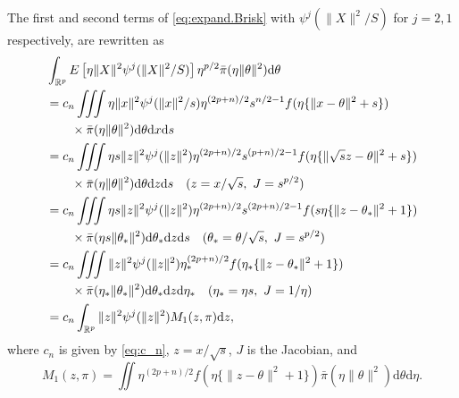 \documentclass[preprint,11pt]{imsart}
\numberwithin{equation}{section}
\theoremstyle{plain}
\theoremstyle{definition}
\theoremstyle{remark}
\newcommand{\rd}{\mathrm{d}}
\begin{document}
The first and second terms of \eqref{eq:expand.Brisk} with $ \psi^j(\|X\|^2/S)$ for $j=2,1$ respectively, are rewritten as
\begin{align}
 & \int_{\mathbb{R}^p} E\left[\eta\|X\|^2\psi^j(\|X\|^2/S)\right]
 \eta^{p/2}\bar{\pi}(\eta\|\theta\|^2) \rd \theta \label{eq:equiv.first.term} \\
 &= c_n \iiint \eta\|x\|^2\psi^j(\|x\|^2/s)
 \eta^{(2p+n)/2}s^{n/2-1}f(\eta\{\|x-\theta\|^2+s\}) \notag\\ &\qquad \times 
 \bar{\pi}(\eta\|\theta\|^2) \rd \theta  \rd x  \rd s \notag\\
 &= c_n \iiint \eta s\|z\|^2\psi^j(\|z\|^2) 
 \eta^{(2p+n)/2}s^{(p+n)/2-1}f(\eta\{\|\sqrt{s}z-\theta\|^2+s\}) \notag\\ &\qquad \times 
\bar{\pi}(\eta\|\theta\|^2) \rd \theta  \rd z  \rd s \quad (z=x/\sqrt{s}, \ J=s^{p/2})\notag\\
 &= c_n \iiint \eta s\|z\|^2\psi^j(\|z\|^2) 
 \eta^{(2p+n)/2}s^{(2p+n)/2-1}f(s\eta\{\|z-\theta_*\|^2+1\}) \notag\\ &\qquad \times 
 \bar{\pi}(\eta s\|\theta_*\|^2) \rd \theta_*  \rd z  \rd s \quad (\theta_*=\theta/\sqrt{s},
 \ J=s^{p/2})\notag\\
 &= c_n \iiint \|z\|^2\psi^j(\|z\|^2) 
 \eta_*^{(2p+n)/2}f(\eta_*\{\|z-\theta_*\|^2+1\}) \notag \\ &\qquad \times 
 \bar{\pi}(\eta_*\|\theta_*\|^2) \rd \theta_*  \rd z  \rd \eta_* \quad (\eta_*=\eta s, \ J=1/\eta)\notag\\
 &= c_n\int_{\mathbb{R}^p} \|z\|^2\psi^j(\|z\|^2) M_1(z,\pi) \rd z, \notag
\end{align}
where $c_n$ is given by \eqref{eq:c_n}, $z=x/\sqrt{s}$, $J$ is the Jacobian, and
\begin{equation}\label{eq:def:M_1}
 M_1(z,\pi)=
 \iint \eta^{(2p+n)/2}f(\eta\{\|z-\theta\|^2+1\})
\bar{\pi}(\eta\|\theta\|^2) \rd \theta   \rd \eta .
\end{equation}
\end{document}
